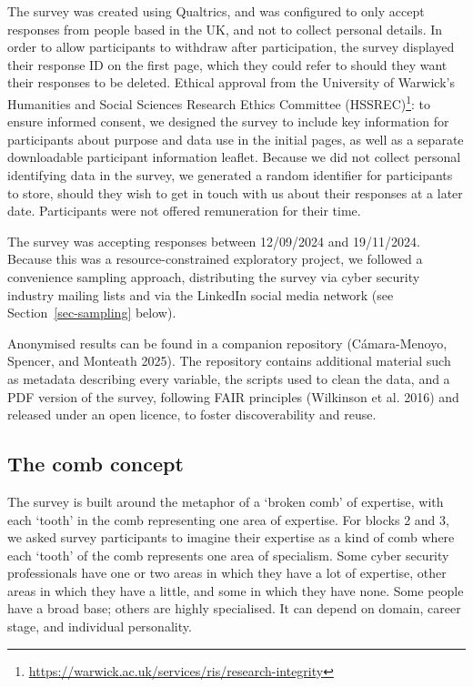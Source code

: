 \documentclass[
  a4paper,
]{book}
\begin{document}
The survey was created using Qualtrics, and was configured to only
accept responses from people based in the UK, and not to collect
personal details. In order to allow participants to withdraw after
participation, the survey displayed their response ID on the first page,
which they could refer to should they want their responses to be
deleted. Ethical approval from the University of Warwick's Humanities
and Social Sciences Research Ethics Committee (HSSREC)\footnote{\url{https://warwick.ac.uk/services/ris/research-integrity}}:
to ensure informed consent, we designed the survey to include key
information for participants about purpose and data use in the initial
pages, as well as a separate downloadable participant information
leaflet. Because we did not collect personal identifying data in the
survey, we generated a random identifier for participants to store,
should they wish to get in touch with us about their responses at a
later date. Participants were not offered remuneration for their time.

The survey was accepting responses between 12/09/2024 and 19/11/2024.
Because this was a resource-constrained exploratory project, we followed
a convenience sampling approach, distributing the survey via cyber
security industry mailing lists and via the LinkedIn social media
network (see Section~\ref{sec-sampling} below).

Anonymised results can be found in a companion repository
(Cámara-Menoyo, Spencer, and Monteath 2025). The repository contains
additional material such as metadata describing every variable, the
scripts used to clean the data, and a PDF version of the survey,
following FAIR principles (Wilkinson et al. 2016) and released under an
open licence, to foster discoverability and reuse.

\subsection{The comb concept}\label{sec-comb}

The survey is built around the metaphor of a `broken comb' of expertise,
with each `tooth' in the comb representing one area of expertise. For
blocks 2 and 3, we asked survey participants to imagine their expertise
as a kind of comb where each `tooth' of the comb represents one area of
specialism. Some cyber security professionals have one or two areas in
which they have a lot of expertise, other areas in which they have a
little, and some in which they have none. Some people have a broad base;
others are highly specialised. It can depend on domain, career stage,
and individual personality.
\end{document}
